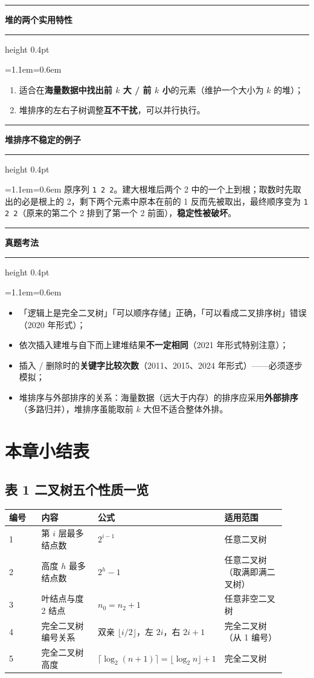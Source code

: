 \documentclass[11pt,openany,UTF8]{ctexbook}
\newcommand{\callouthead}[2]{%
  \par\addvspace{7pt}\noindent
  {\color{#1}\rule[-0.15em]{3pt}{1.05em}}\hspace{0.5em}%
  {\bfseries\color{#1}#2}\par\nobreak\vspace{-0.35em}%
  {\color{rulesep}\hrule height 0.4pt}\nobreak\vspace{0.45em}%
  \begingroup\small\setlength{\parindent}{0pt}%
  \leftskip=1.1em\rightskip=0.6em\noindent\ignorespaces}
\newcommand{\calloutend}{\par\endgroup\addvspace{7pt}}
\newenvironment{callkey}[1]{\callouthead{keybar}{#1}}{\calloutend}
\newenvironment{callwarn}[1]{\callouthead{warnbar}{#1}}{\calloutend}
\newenvironment{callexam}[1]{\callouthead{exambar}{#1}}{\calloutend}
\begin{document}
\begin{callkey}{堆的两个实用特性}
\begin{enumerate}
\item 适合在\textbf{海量数据中找出前 $k$ 大 / 前 $k$ 小}的元素（维护一个大小为 $k$ 的堆）；
\item 堆排序的左右子树调整\textbf{互不干扰}，可以并行执行。
\end{enumerate}
\end{callkey}

\begin{callwarn}{堆排序不稳定的例子}
原序列 \texttt{1 2 2}。建大根堆后两个 2 中的一个上到根；取数时先取出的必是根上的 2，剩下两个元素中原本在前的 1 反而先被取出，最终顺序变为 \texttt{1 2 2}（原来的第二个 2 排到了第一个 2 前面），\textbf{稳定性被破坏}。

\end{callwarn}

\begin{callexam}{真题考法}
\begin{itemize}
\item 「逻辑上是完全二叉树」「可以顺序存储」正确，「可以看成二叉排序树」错误（2020 年形式）；
\item 依次插入建堆与自下而上建堆结果\textbf{不一定相同}（2021 年形式特别注意）；
\item 插入 / 删除时的\textbf{关键字比较次数}（2011、2015、2024 年形式）——必须逐步模拟；
\item 堆排序与外部排序的关系：海量数据（远大于内存）的排序应采用\textbf{外部排序}（多路归并），堆排序虽能取前 $k$ 大但不适合整体外排。
\end{itemize}
\end{callexam}

\section*{本章小结表}

\subsection{表 1 二叉树五个性质一览}

\begingroup\small\setlength{\tabcolsep}{4.0pt}
\begin{longtable}{@{}L{0.1540\linewidth}L{0.2952\linewidth}L{0.1540\linewidth}L{0.3081\linewidth}@{}}
\toprule
\textbf{编号} & \textbf{内容} & \textbf{公式} & \textbf{适用范围} \\
\midrule
{} & 第 $i$ 层最多结点数 & $2^{i-1}$ & 任意二叉树 \\
2 & 高度 $h$ 最多结点数 & $2^h-1$ & 任意二叉树（取满即满二叉树） \\
3 & 叶结点与度 2 结点 & $n_0=n_2+1$ & 任意非空二叉树 \\
4 & 完全二叉树编号关系 & 双亲 $\lfloor i/2\rfloor$，左 $2i$，右 $2i+1$ & 完全二叉树（从 1 编号） \\
5 & 完全二叉树高度 & $\lceil\log_2(n+1)\rceil=\lfloor\log_2 n\rfloor+1$ & 完全二叉树 \\
\bottomrule
\end{longtable}
\endgroup
\end{document}
